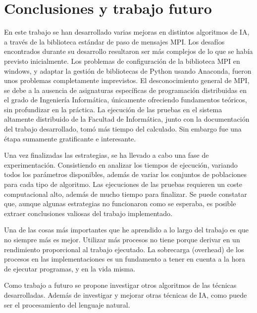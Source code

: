\chapter{Conclusiones y trabajo futuro}
\label{cap:c5_conclu}

	En este trabajo se han desarrollado varias mejoras en distintos algoritmos de IA, a través de la biblioteca estándar de paso de mensajes MPI. Los desafíos encontrados durante su desarrollo resultaron ser más complejos de lo que se había previsto inicialmente. Los problemas de configuración de la biblioteca MPI en windows, y adaptar la gestión de bibliotecas de Python usando Anaconda, fueron unos problemas completamente imprevistos. El desconocimiento general de  MPI, se debe a la ausencia de asignaturas específicas de programación distribuidas en el grado de Ingeniería Informática, únicamente ofreciendo fundamentos teóricos, sin profundizar en la práctica. La ejecución de las pruebas en el sistema altamente distribuido de la Facultad de Informática, junto con la documentación del trabajo desarrollado, tomó más tiempo del calculado. Sin embargo fue una étapa sumamente gratificante e interesante. 
	
	
	Una vez finalizadas las estrategias, se ha llevado a cabo una fase de experimentación. Consistiendo en analizar los tiempos de ejecución, variando todos los parámetros disponibles, además de variar los conjuntos de poblaciones para cada tipo de algoritmo. Las ejecuciones de las pruebas requieren un coste computacional alto, además de mucho tiempo para finalizar. Se puede constatar que, aunque algunas estrategias no funcionaron como se esperaba, es posible extraer conclusiones valiosas del trabajo implementado.
	
	Una de las cosas más importantes que he aprendido a lo largo del trabajo es que no siempre más es mejor. Utilizar más procesos no tiene porque derivar en un rendimiento proporcional al trabajo ejecutado. La sobrecarga (overhead) de los procesos en las implementaciones es un fundamento a tener en cuenta a la hora de ejecutar programas, y en la vida misma.	
	
	
	Como trabajo a futuro se propone investigar otros algoritmos de las técnicas desarrolladas. Además de investigar y mejorar otras técnicas de IA, como puede ser el procesamiento del lenguaje natural.
	
	
	
	
	